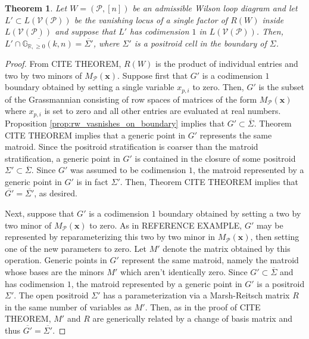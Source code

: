 \documentclass[11pt]{article}
\newcommand{\R}{\mathbb{R}}
\newcommand{\Gr}{\mathbb{G}_{\R, \geq 0}}
\newcommand{\cP}{\mathcal{P}}
\newcommand{\cV}{\mathcal{V}}
\newcommand{\VP}{\cV(\cP)}
\newtheorem{thm}{Theorem}[section]
\theoremstyle{remark}
\theoremstyle{definition}
\begin{document}

\begin{thm}\label{res:polesonboundaries}
Let $W=(\mathcal{P},[n])$ be an admissible Wilson loop diagram and let $L' \subset L(\VP)$ be the vanishing locus of a single factor of $R(W)$ inside $L(\VP)$ and suppose that $L'$ has codimension $1$ in $L(\VP)$. Then, $\overline{L'\cap \Gr(k, n)} = \overline{\Sigma'}$, where $\Sigma'$ is a positroid cell in the boundary of $\Sigma$. \end{thm}

\begin{proof}
From CITE THEOREM, $R(W)$ is the product of individual entries and two by two minors of $M_{\mathcal{P}}(\mathbf{x})$. Suppose first that $G'$ is a codimension $1$ boundary obtained by setting a single variable $x_{p,i}$ to zero. Then, $G'$ is the subset of the Grassmannian consisting of row spaces of matrices of the form $M_{\mathcal{P}}(\mathbf{x})$ where $x_{p,i}$ is set to zero and all other entries are evaluated at real numbers. Proposition \ref{prop:rw_vasnishes_on_boundary} implies that $G' \subset \overline{\Sigma}$. Theorem CITE THEOREM implies that a generic point in $G'$ represents the same matroid. Since the positroid stratification is coarser than the matroid stratification, a generic point in $G'$ is contained in the closure of some positroid $\Sigma' \subset \overline{\Sigma}$. Since $G'$ was assumed to be codimension $1$, the matroid represented by a generic point in $G'$ is in fact $\Sigma'$. Then, Theorem CITE THEOREM implies that $\overline{G'} = \overline{\Sigma'}$, as desired.

Next, suppose that $G'$ is a codimension $1$ boundary obtained by setting a two by two minor of $M_{\mathcal{P}}(\mathbf{x})$ to zero. As in REFERENCE EXAMPLE, $G'$ may be represented by reparameterizing this two by two minor in $M_{\mathcal{P}}(\mathbf{x})$, then setting one of the new parameters to zero. Let $M'$ denote the matrix obtained by this operation. Generic points in $G'$ represent the same matroid, namely the matroid whose bases are the minors $M'$ which aren't identically zero. Since $G' \subset \overline{\Sigma}$ and has codimension $1$, the matroid represented by a generic point in $G'$ is a positroid $\Sigma'$. The open positroid $\Sigma'$ has a parameterization via a Marsh-Reitsch matrix $R$ in the same number of variables as $M'$. Then, as in the proof of CITE THEOREM, $M'$ and $R$ are generically related by a change of basis matrix and thus $\overline{G'} = \overline{\Sigma'}$.
\end{proof}
\end{document}
